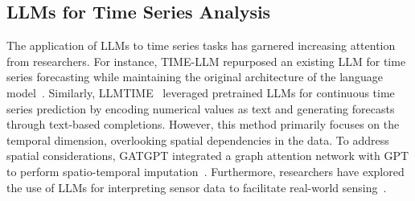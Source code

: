 \subsection{LLMs for Time Series Analysis}
The application of LLMs to time series tasks has garnered increasing attention from researchers. For instance, TIME-LLM repurposed an existing LLM for time series forecasting while maintaining the original architecture of the language model~\cite{jin2023time}. 
Similarly, LLMTIME~\cite{gruver2024large} leveraged pretrained LLMs for continuous time series prediction by encoding numerical values as text and generating forecasts through text-based completions. However, this method primarily focuses on the temporal dimension, overlooking spatial dependencies in the data.
To address spatial considerations, GATGPT integrated a graph attention network with GPT to perform spatio-temporal imputation~\cite{chen2023gatgpt}. 
Furthermore, researchers have explored the use of LLMs for interpreting sensor data to facilitate real-world sensing~\cite{ji2024hargpt,yang2024you,yang2024transcompressor}.





